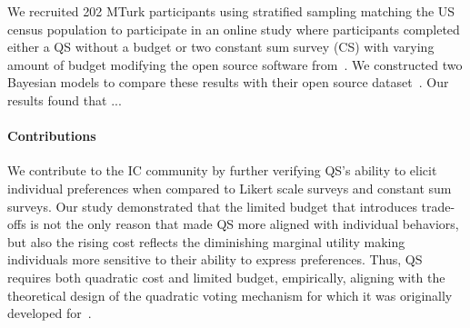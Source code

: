 
We recruited 202 MTurk participants using stratified sampling matching the US census population to participate in an online study where participants completed either a QS without a budget or two constant sum survey (CS) with varying amount of budget modifying the open source software from~\citet{chengCanShowWhat2021}. We constructed two Bayesian models to compare these results with their open source dataset~\cite{illinoisdatabankIDB-1928463}. Our results found that ...



\paragraph{Contributions}
We contribute to the IC community by further verifying QS's ability to elicit individual preferences when compared to Likert scale surveys and constant sum surveys. Our study demonstrated that the limited budget that introduces trade-offs is not the only reason that made QS more aligned with individual behaviors, but also the rising cost reflects the diminishing marginal utility making individuals more sensitive to their ability to express preferences. Thus, QS requires both quadratic cost and limited budget, empirically, aligning with the theoretical design of the quadratic voting mechanism for which it was originally developed for~\cite{lalley2016quadratic}.
